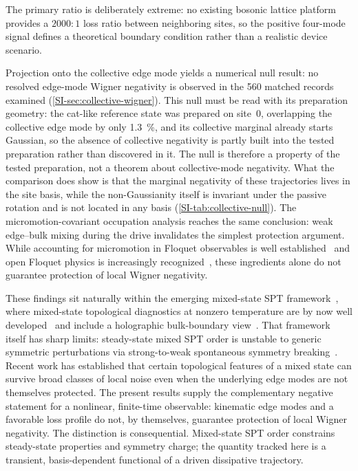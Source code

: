 \documentclass[aps,pra,preprint,superscriptaddress,amsmath,amssymb]{revtex4-2}
\begin{document}
The primary ratio is deliberately extreme: no existing bosonic lattice platform provides a $\num{2000}\colon\num{1}$ loss ratio between neighboring sites, so the positive four-mode signal defines a theoretical boundary condition rather than a realistic device scenario.

Projection onto the collective edge mode yields a numerical null result: no resolved edge-mode Wigner negativity is observed in the \num{560} matched records examined (\cref{SI-sec:collective-wigner}). This null must be read with its preparation geometry: the cat-like reference state was prepared on site~0, overlapping the collective edge mode by only \qty{1.3}{\percent}, and its collective marginal already starts Gaussian, so the absence of collective negativity is partly built into the tested preparation rather than discovered in it. The null is therefore a property of the tested preparation, not a theorem about collective-mode negativity. What the comparison does show is that the marginal negativity of these trajectories lives in the site basis, while the non-Gaussianity itself is invariant under the passive rotation and is not located in any basis (\cref{SI-tab:collective-null}). The micromotion-covariant occupation analysis reaches the same conclusion: weak edge--bulk mixing during the drive invalidates the simplest protection argument. While accounting for micromotion in Floquet observables is well established~\cite{Xu2022micromotion} and open Floquet physics is increasingly recognized~\cite{Mori2023,Chen2024,Roy2025}, these ingredients alone do not guarantee protection of local Wigner negativity.

These findings sit naturally within the emerging mixed-state SPT framework~\cite{Paszko2024,Chirame2025}, where mixed-state topological diagnostics at nonzero temperature are by now well developed~\cite{Hannukainen2026} and include a holographic bulk-boundary view~\cite{Sun2025holographic}. That framework itself has sharp limits: steady-state mixed SPT order is unstable to generic symmetric perturbations via strong-to-weak spontaneous symmetry breaking~\cite{Shah2025instability}. Recent work has established that certain topological features of a mixed state can survive broad classes of local noise even when the underlying edge modes are not themselves protected. The present results supply the complementary negative statement for a nonlinear, finite-time observable: kinematic edge modes and a favorable loss profile do not, by themselves, guarantee protection of local Wigner negativity. The distinction is consequential. Mixed-state SPT order constrains steady-state properties and symmetry charge; the quantity tracked here is a transient, basis-dependent functional of a driven dissipative trajectory.
\end{document}
